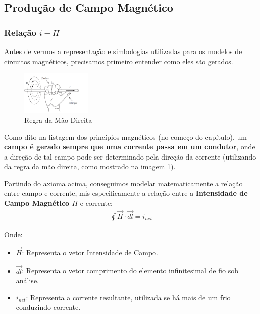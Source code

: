 \documentclass{article}
\begin{document}
\subsection{Produção de Campo Magnético}
\subsubsection{Relação $i-H$}

Antes de vermos a representação e simbologias utilizadas para os modelos de circuitos magnéticos, precisamos primeiro entender como eles são gerados.


\begin{figure}
    \vspace{-25px}
    \centering
    \includegraphics[width=0.3\textwidth]{imgs/2023-08-15 10_18_18-1_CIRCUITOS_MAG.pdf - ET520 - Princípios de Conversão de Energia - Visual Studio.png}
    \caption{Regra da Mão Direita}
    \label{img:regra_da_mao_direita}
\end{figure}

Como dito na listagem dos princípios magnéticos (no começo do capítulo), um \textbf{campo é gerado sempre que uma corrente passa em um condutor}, onde a direção de tal campo pode ser determinado pela direção da corrente (utilizando da regra da mão direita, como mostrado na imagem \ref{img:regra_da_mao_direita}).

Partindo do axioma acima, conseguimos modelar matematicamente a relação entre campo e corrente, mis especificamente a relação entre a \textbf{Intensidade de Campo Magnético $H$} e corrente:
\begin{align}
    \oint \vec H \cdot \vec{dl} = i_{net}
\end{align}

Onde:
\begin{itemize}
    \item $\vec H$: Representa o vetor Intensidade de Campo.
    \item $\vec{dl}$: Representa o vetor comprimento do elemento infinitesimal de fio sob análise.
    \item $i_{net}$: Representa a corrente resultante, utilizada se há mais de um frio conduzindo corrente. 
\end{itemize}
\end{document}
